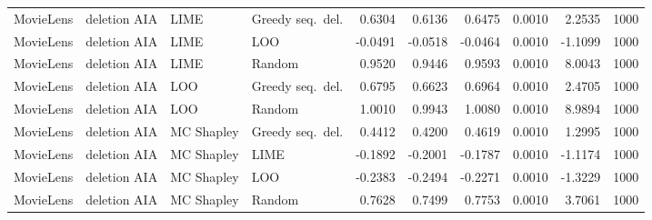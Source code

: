 \begin{longtable}{@{}p{}p{}p{}p{}rrrrrr@{}}
MovieLens & deletion AIA & LIME & Greedy seq.\ del. & 0.6304 & 0.6136 & 0.6475 & 0.0010 & 2.2535 & 1000 \\
MovieLens & deletion AIA & LIME & LOO & -0.0491 & -0.0518 & -0.0464 & 0.0010 & -1.1099 & 1000 \\
MovieLens & deletion AIA & LIME & Random & 0.9520 & 0.9446 & 0.9593 & 0.0010 & 8.0043 & 1000 \\
MovieLens & deletion AIA & LOO & Greedy seq.\ del. & 0.6795 & 0.6623 & 0.6964 & 0.0010 & 2.4705 & 1000 \\
MovieLens & deletion AIA & LOO & Random & 1.0010 & 0.9943 & 1.0080 & 0.0010 & 8.9894 & 1000 \\
MovieLens & deletion AIA & MC Shapley & Greedy seq.\ del. & 0.4412 & 0.4200 & 0.4619 & 0.0010 & 1.2995 & 1000 \\
MovieLens & deletion AIA & MC Shapley & LIME & -0.1892 & -0.2001 & -0.1787 & 0.0010 & -1.1174 & 1000 \\
MovieLens & deletion AIA & MC Shapley & LOO & -0.2383 & -0.2494 & -0.2271 & 0.0010 & -1.3229 & 1000 \\
MovieLens & deletion AIA & MC Shapley & Random & 0.7628 & 0.7499 & 0.7753 & 0.0010 & 3.7061 & 1000 \\
\end{longtable}
